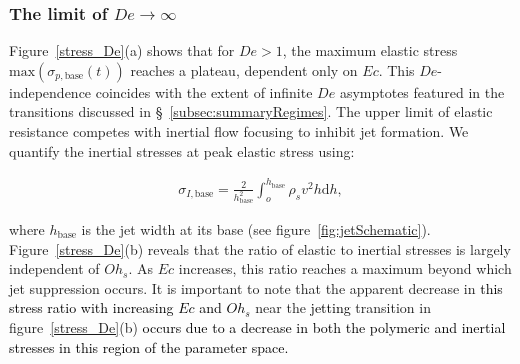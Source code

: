 \documentclass{jfm}
\newcommand{\DL}[1]{{\textcolor{black}{#1}}}
\newcommand{\VS}[1]{{\textcolor{black}{#1}}}
\begin{document}
\subsubsection{The limit of $De \to \infty$}

Figure~\ref{stress_De}(a) shows that for $De > 1$, the maximum elastic stress $\text{max}\left(\sigma_{p,\text{base}}(t)\right)$ reaches a plateau, dependent only on $Ec$. This $De$-independence coincides with the extent of infinite $De$ asymptotes featured in the transitions discussed in \S~\ref{subsec:summaryRegimes}.
The upper limit of elastic resistance competes with inertial flow focusing to inhibit jet formation. We quantify the inertial stresses at peak elastic stress using:

\begin{align}
	\sigma_{I,\text{base}} = \frac{2}{h_{\text{base}}^2}\int_{o}^{h_{\text{base}}} \rho_s v^2 h\mathrm{d}h,
\end{align}

\noindent where $h_{\text{base}}$ is the jet width at its base (see figure~\ref{fig:jetSchematic}).
Figure~\ref{stress_De}(b) reveals that the ratio of elastic to inertial stresses is largely independent of $Oh_s$. As $Ec$ increases, this ratio reaches a maximum beyond which jet suppression occurs.
It is important to note that the apparent decrease in \DL{this stress ratio with increasing $Ec$ and $Oh_s$} near the \VS{jetting} transition in figure~\ref{stress_De}(b) \DL{occurs due to a decrease in both the polymeric and inertial stresses in this region of the parameter space.}
\end{document}
